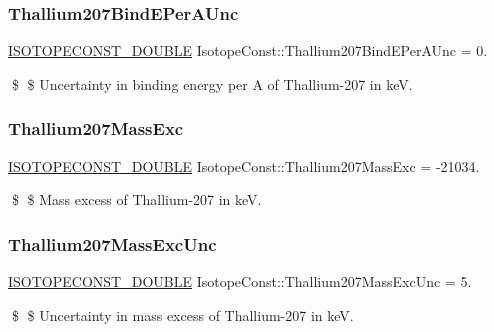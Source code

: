 \subsubsection{\texorpdfstring{Thallium207\+Bind\+E\+Per\+A\+Unc}{Thallium207BindEPerAUnc}}
{\footnotesize\ttfamily \mbox{\hyperlink{group___isotope_const-_macros_ga8f45a7272ce02c0b4c65c44636ed719a}{I\+S\+O\+T\+O\+P\+E\+C\+O\+N\+S\+T\+\_\+\+D\+O\+U\+B\+LE}} Isotope\+Const\+::\+Thallium207\+Bind\+E\+Per\+A\+Unc = 0.}

\$ \$ Uncertainty in binding energy per A of Thallium-\/207 in keV. \mbox{\label{group___isotope_const-_thallium-_tl207_ga9bc218f2255989ac2ca56a47ade6bfdc}} 
\subsubsection{\texorpdfstring{Thallium207\+Mass\+Exc}{Thallium207MassExc}}
{\footnotesize\ttfamily \mbox{\hyperlink{group___isotope_const-_macros_ga8f45a7272ce02c0b4c65c44636ed719a}{I\+S\+O\+T\+O\+P\+E\+C\+O\+N\+S\+T\+\_\+\+D\+O\+U\+B\+LE}} Isotope\+Const\+::\+Thallium207\+Mass\+Exc = -\/21034.}

\$ \$ Mass excess of Thallium-\/207 in keV. \mbox{\label{group___isotope_const-_thallium-_tl207_ga493d6155968b69dec381c689f1c11a1d}} 
\subsubsection{\texorpdfstring{Thallium207\+Mass\+Exc\+Unc}{Thallium207MassExcUnc}}
{\footnotesize\ttfamily \mbox{\hyperlink{group___isotope_const-_macros_ga8f45a7272ce02c0b4c65c44636ed719a}{I\+S\+O\+T\+O\+P\+E\+C\+O\+N\+S\+T\+\_\+\+D\+O\+U\+B\+LE}} Isotope\+Const\+::\+Thallium207\+Mass\+Exc\+Unc = 5.}

\$ \$ Uncertainty in mass excess of Thallium-\/207 in keV. \mbox{\label{group___isotope_const-_thallium-_tl207_ga0fe96f9a0b9315059a990bb37210842a}} 
